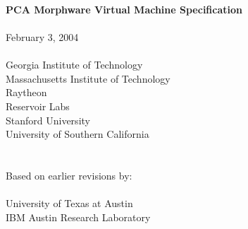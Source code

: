 \documentclass[10pt]{article}
\begin{document}
  \begin{titlepage}
    \begin{center}
      {\LARGE
	~ \\ ~ \\ ~ \\ ~ \\ ~ \\ ~ \\ ~ \\ ~ \\
	{\bf PCA Morphware Virtual Machine Specification \\ ~ \\}
      }
      {\Large
	February 3, 2004 \\ ~ \\
      }
      {\large
	Georgia Institute of Technology \\
	Massachusetts Institute of Technology \\ Raytheon \\ Reservoir Labs \\ Stanford University \\ University of Southern California \\ ~ \\ ~ \\ 
	Based on earlier revisions by: \\ ~ \vspace{-8pt} \\
	University of Texas at Austin \\ IBM Austin Research Laboratory
      }
    \end{center}
  \end{titlepage}

  \newcommand{\mt}[1]{\mbox{\it #1}}
  \newcommand{\todo}[1]{\framebox{\bf #1}}
  \newcommand{\sss}[1]{\medskip \noindent {\bf #1} \smallskip}
  \newcommand{\ssss}[1]{\medskip \noindent {\bf #1:}}
  \newcommand{\makeline}[0]{\rule{0cm}{0cm}\\\hrule\rule{0cm}{0cm}}

  \newcommand{\lp}[2]{\raisebox{-6pt}{\parbox{#1}{#2 \vspace{2pt}}}}
  \newcommand{\lpp}[2]{\raisebox{-13pt}{\parbox{#1}{#2 \vspace{2pt}}}}

  \newcommand{\name}[1]{

    \medskip \noindent {\bf #1}
  }

  \newcommand{\decl}[1]{

    \medskip \noindent {\tt #1} \medskip
  }
\end{document}
